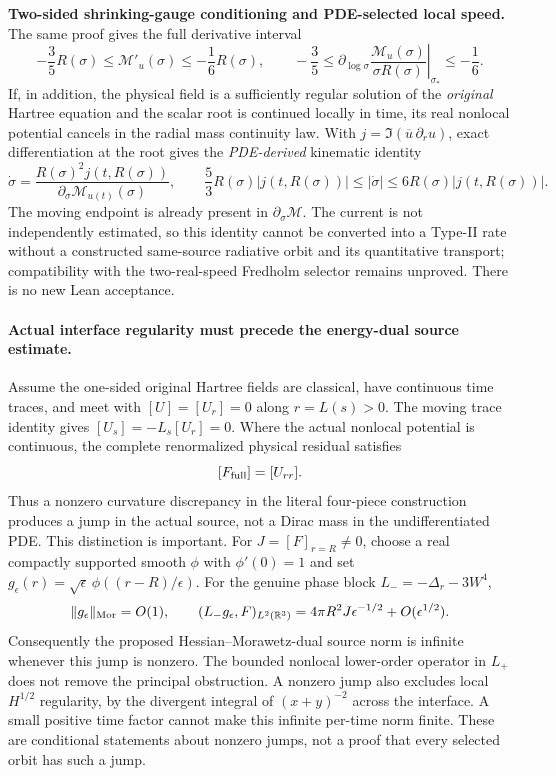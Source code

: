 \documentclass[11pt]{amsart}
\begin{document}
\noindent\textbf{Two-sided shrinking-gauge conditioning and PDE-selected
local speed.}  The same proof gives the full derivative interval
\[
 -\frac35R(\sigma)\le\mathcal M'_u(\sigma)
 \le-\frac16R(\sigma),\qquad
 -\frac35\le
 \left.\partial_{\log\sigma}
  \frac{\mathcal M_u(\sigma)}{\sigma R(\sigma)}
 \right|_{\sigma_*}\le-\frac16.
\]
If, in addition, the physical field is a sufficiently regular solution
of the \emph{original} Hartree equation and the scalar root is
continued locally in time, its real nonlocal potential cancels in the
radial mass continuity law.  With
$j=\Im(\overline u\,\partial_r u)$, exact differentiation at the root
gives the \emph{PDE-derived} kinematic identity
\[
 \dot\sigma=\frac{R(\sigma)^2j(t,R(\sigma))}
                  {\partial_\sigma\mathcal M_{u(t)}(\sigma)},
 \qquad
 \frac53 R(\sigma)|j(t,R(\sigma))|
 \le|\dot\sigma|
 \le6R(\sigma)|j(t,R(\sigma))|.
\]
The moving endpoint is already present in
$\partial_\sigma\mathcal M$.  The current is not independently
estimated, so this identity cannot be converted into a Type-II rate
without a constructed same-source radiative orbit and its
quantitative transport; compatibility with the two-real-speed
Fredholm selector remains unproved.  There is no new Lean acceptance.



\paragraph{Actual interface regularity must precede the energy-dual source estimate.}
Assume the one-sided original Hartree fields are classical, have
continuous time traces, and meet with $[U]=[U_r]=0$ along $r=L(s)>0$.
The moving trace identity gives $[U_s]=-L_s[U_r]=0$.
Where the actual nonlocal potential is continuous, the complete
renormalized physical residual satisfies
\[
 [F_{\rm full}]=[U_{rr}].
\]
Thus a nonzero curvature discrepancy in the literal four-piece
construction produces a jump in the actual source, not a Dirac
mass in the undifferentiated PDE. This distinction is important.
For $J=[F]_{r=R}\ne0$, choose a real compactly supported smooth
$\phi$ with $\phi'(0)=1$ and set
$g_\epsilon(r)=\sqrt\epsilon\,\phi((r-R)/\epsilon)$.
For the genuine phase block $L_-=-\Delta_r-3W^4$,
\[
 \|g_\epsilon\|_{\rm Mor}=O(1),\qquad
 (L_-g_\epsilon,F)_{L^2(\mathbb R^3)}
   =4\pi R^2J\epsilon^{-1/2}+O(\epsilon^{1/2}).
\]
Consequently the proposed Hessian--Morawetz-dual source norm is
infinite whenever this jump is nonzero. The bounded nonlocal
lower-order operator in $L_+$ does not remove the principal
obstruction. A nonzero jump also excludes local $H^{1/2}$
regularity, by the divergent integral of $(x+y)^{-2}$ across the
interface. A small positive time factor cannot make this infinite
per-time norm finite. These are conditional statements about
nonzero jumps, not a proof that every selected orbit has such a jump.
\end{document}
